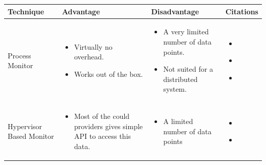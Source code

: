 \begin{longtable}{| p{23mm} | p{42mm} | p{42mm} | p{42mm} |}
\hline
    \textbf{Technique} &
    \textbf{Advantage} &
    \textbf{Disadvantage} &
    \textbf{Citations} \\ \hline

    Process Monitor &
    \vspace{-8mm}
    \begin{itemize}[leftmargin=0mm,noitemsep,nolistsep,label={}] 
        \item Virtually no overhead.
        \item Works out of the box.
        \vspace{-7mm}
    \end{itemize} &
    \vspace{-8mm}
    \begin{itemize}[leftmargin=0mm,noitemsep,nolistsep,label={}] 
        \item A very limited number of data points.
        \item     Not suited for a distributed system.
        \vspace{-7mm}
    \end{itemize} &
    \vspace{-8mm}
    \begin{itemize}[leftmargin=0mm,noitemsep,nolistsep,label={}] 
        \item \cite{chigurupati2017root}
        \item \cite{kumarage2018anomaly}
        \item \cite{kumarage2019generative}
        \vspace{-7mm}
    \end{itemize} \\ \hline

    Hypervisor Based Monitor &
    \vspace{-8mm}
    \begin{itemize}[leftmargin=0mm,noitemsep,nolistsep,label={}] 
        \item Most of the could providers gives simple API to access this data.
        \vspace{-7mm}
    \end{itemize} &
    \vspace{-8mm}
    \begin{itemize}[leftmargin=0mm,noitemsep,nolistsep,label={}] 
        \item A limited number of data points
        \vspace{-7mm}
    \end{itemize} &
    \vspace{-8mm}
    \begin{itemize}[leftmargin=0mm,noitemsep,nolistsep,label={}] 
        \item \cite{du2018anomaly}
        \item \cite{geethika2019anomaly}
        \vspace{-7mm}
    \end{itemize} \\ \hline
    

\end{longtable}
